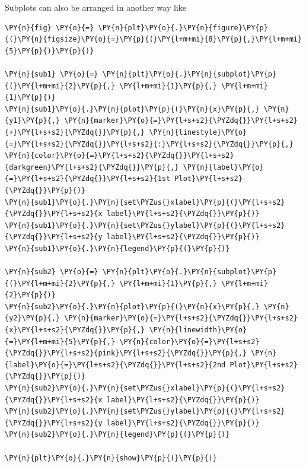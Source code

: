 Subplots can also be arranged in another way like

\begin{tcolorbox}[breakable, size=fbox, boxrule=1pt, pad at break*=1mm,colback=cellbackground, colframe=cellborder]
\begin{Verbatim}[commandchars=\\\{\}]
\PY{n}{fig} \PY{o}{=} \PY{n}{plt}\PY{o}{.}\PY{n}{figure}\PY{p}{(}\PY{n}{figsize}\PY{o}{=}\PY{p}{(}\PY{l+m+mi}{8}\PY{p}{,}\PY{l+m+mi}{5}\PY{p}{)}\PY{p}{)}
	
\PY{n}{sub1} \PY{o}{=} \PY{n}{plt}\PY{o}{.}\PY{n}{subplot}\PY{p}{(}\PY{l+m+mi}{2}\PY{p}{,} \PY{l+m+mi}{1}\PY{p}{,} \PY{l+m+mi}{1}\PY{p}{)}
\PY{n}{sub1}\PY{o}{.}\PY{n}{plot}\PY{p}{(}\PY{n}{x}\PY{p}{,} \PY{n}{y1}\PY{p}{,} \PY{n}{marker}\PY{o}{=}\PY{l+s+s2}{\PYZdq{}}\PY{l+s+s2}{+}\PY{l+s+s2}{\PYZdq{}}\PY{p}{,} \PY{n}{linestyle}\PY{o}{=}\PY{l+s+s2}{\PYZdq{}}\PY{l+s+s2}{:}\PY{l+s+s2}{\PYZdq{}}\PY{p}{,} \PY{n}{color}\PY{o}{=}\PY{l+s+s2}{\PYZdq{}}\PY{l+s+s2}{darkgreen}\PY{l+s+s2}{\PYZdq{}}\PY{p}{,} \PY{n}{label}\PY{o}{=}\PY{l+s+s2}{\PYZdq{}}\PY{l+s+s2}{1st Plot}\PY{l+s+s2}{\PYZdq{}}\PY{p}{)}
\PY{n}{sub1}\PY{o}{.}\PY{n}{set\PYZus{}xlabel}\PY{p}{(}\PY{l+s+s2}{\PYZdq{}}\PY{l+s+s2}{x label}\PY{l+s+s2}{\PYZdq{}}\PY{p}{)}
\PY{n}{sub1}\PY{o}{.}\PY{n}{set\PYZus{}ylabel}\PY{p}{(}\PY{l+s+s2}{\PYZdq{}}\PY{l+s+s2}{y label}\PY{l+s+s2}{\PYZdq{}}\PY{p}{)}
\PY{n}{sub1}\PY{o}{.}\PY{n}{legend}\PY{p}{(}\PY{p}{)}
	
\PY{n}{sub2} \PY{o}{=} \PY{n}{plt}\PY{o}{.}\PY{n}{subplot}\PY{p}{(}\PY{l+m+mi}{2}\PY{p}{,} \PY{l+m+mi}{1}\PY{p}{,} \PY{l+m+mi}{2}\PY{p}{)}
\PY{n}{sub2}\PY{o}{.}\PY{n}{plot}\PY{p}{(}\PY{n}{x}\PY{p}{,} \PY{n}{y2}\PY{p}{,} \PY{n}{marker}\PY{o}{=}\PY{l+s+s2}{\PYZdq{}}\PY{l+s+s2}{x}\PY{l+s+s2}{\PYZdq{}}\PY{p}{,} \PY{n}{linewidth}\PY{o}{=}\PY{l+m+mi}{5}\PY{p}{,} \PY{n}{color}\PY{o}{=}\PY{l+s+s2}{\PYZdq{}}\PY{l+s+s2}{pink}\PY{l+s+s2}{\PYZdq{}}\PY{p}{,} \PY{n}{label}\PY{o}{=}\PY{l+s+s2}{\PYZdq{}}\PY{l+s+s2}{2nd Plot}\PY{l+s+s2}{\PYZdq{}}\PY{p}{)}
\PY{n}{sub2}\PY{o}{.}\PY{n}{set\PYZus{}xlabel}\PY{p}{(}\PY{l+s+s2}{\PYZdq{}}\PY{l+s+s2}{x label}\PY{l+s+s2}{\PYZdq{}}\PY{p}{)}
\PY{n}{sub2}\PY{o}{.}\PY{n}{set\PYZus{}ylabel}\PY{p}{(}\PY{l+s+s2}{\PYZdq{}}\PY{l+s+s2}{y label}\PY{l+s+s2}{\PYZdq{}}\PY{p}{)}
\PY{n}{sub2}\PY{o}{.}\PY{n}{legend}\PY{p}{(}\PY{p}{)}
	
\PY{n}{plt}\PY{o}{.}\PY{n}{show}\PY{p}{(}\PY{p}{)}
\end{Verbatim}
\end{tcolorbox}

